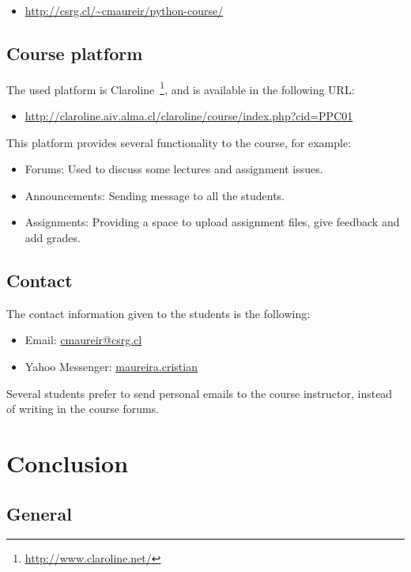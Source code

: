 \documentclass[letter, 10pt]{article}
\begin{document}
\begin{itemize}
    \item \url{http://csrg.cl/~cmaureir/python-course/}
\end{itemize}

\subsection{Course platform}

The used platform is Claroline~\footnote{\url{http://www.claroline.net/}},
and is available in the following URL:

\begin{itemize}
    \item \url{http://claroline.aiv.alma.cl/claroline/course/index.php?cid=PPC01}
\end{itemize}

This platform provides several functionality to the course,
for example:
\begin{itemize}
    \item Forums: Used to discuss some lectures and assignment issues.
    \item Announcements: Sending message to all the students.
    \item Assignments: Providing a space to upload assignment files, give feedback and add grades.
\end{itemize}

\subsection{Contact}

The contact information given to the students
is the following:

\begin{itemize}
    \item Email: \url{cmaureir@csrg.cl}
    \item Yahoo Messenger: \url{maureira.cristian}
\end{itemize}

Several students prefer to send personal emails to the course instructor,
instead of writing in the course forums.

\section{Conclusion}

\subsection{General}
\end{document}
